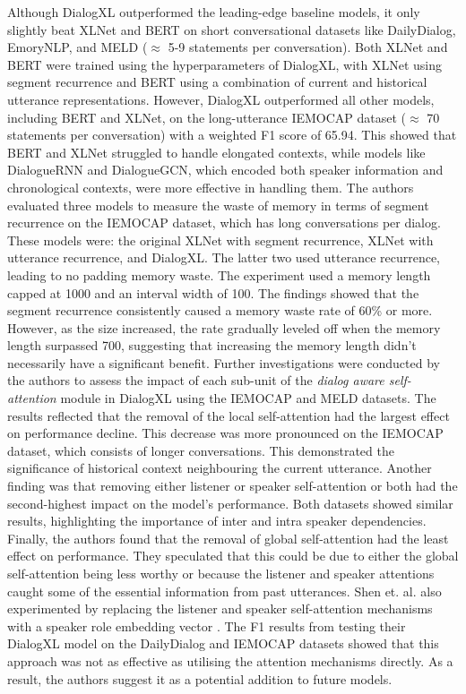 Although DialogXL outperformed the leading-edge baseline models, it only slightly beat XLNet and BERT on short conversational datasets like DailyDialog, EmoryNLP, and MELD ($\approx$ 5-9 statements per conversation). Both XLNet and BERT were trained using the hyperparameters of DialogXL, with XLNet using segment recurrence and BERT using a combination of current and historical utterance representations. However, DialogXL outperformed all other models, including BERT and XLNet, on the long-utterance IEMOCAP dataset ($\approx$ 70 statements per conversation) with a weighted F1 score of 65.94. This showed that BERT and XLNet struggled to handle elongated contexts, while models like DialogueRNN and DialogueGCN, which encoded both speaker information and chronological contexts, were more effective in handling them. The authors evaluated three models to measure the waste of memory in terms of segment recurrence on the IEMOCAP dataset, which has long conversations per dialog. These models were: the original XLNet with segment recurrence, XLNet with utterance recurrence, and DialogXL. The latter two used utterance recurrence, leading to no padding memory waste. The experiment used a memory length capped at 1000 and an interval width of 100. The findings showed that the segment recurrence consistently caused a memory waste rate of 60\% or more. However, as the size increased, the rate gradually leveled off when the memory length surpassed 700, suggesting that increasing the memory length didn't necessarily have a significant benefit. Further investigations were conducted by the authors to assess the impact of each sub-unit of the \textit{dialog aware self-attention} module in DialogXL using the IEMOCAP and MELD datasets. The results reflected that the removal of the local self-attention had the largest effect on performance decline. This decrease was more pronounced on the IEMOCAP dataset, which consists of longer conversations. This demonstrated the significance of historical context neighbouring the current utterance. Another finding was that removing either listener or speaker self-attention or both had the second-highest impact on the model's performance. Both datasets showed similar results, highlighting the importance of inter and intra speaker dependencies. Finally, the authors found that the removal of global self-attention had the least effect on performance. They speculated that this could be due to either the global self-attention being less worthy or because the listener and speaker attentions caught some of the essential information from past utterances. Shen et. al. also experimented by replacing the listener and speaker self-attention mechanisms with a speaker role embedding vector \cite{Bao2019PLATOPD,Ham2020EndtoEndNP}. The F1 results from testing their DialogXL model on the DailyDialog and IEMOCAP datasets showed that this approach was not as effective as utilising the attention mechanisms directly. As a result, the authors suggest it as a potential addition to future models.


